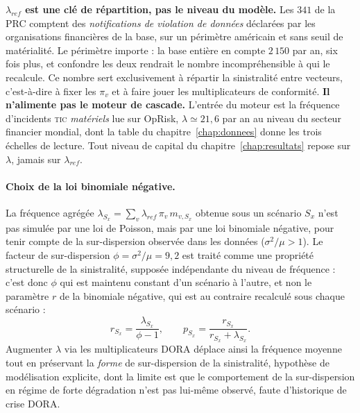 \begin{attention}
\textbf{$\lambda_{ref}$ est une clé de répartition, pas le niveau du modèle.} Les $341$ de la
PRC comptent des \emph{notifications de violation de données} déclarées par les organisations
financières de la base, sur un périmètre américain et sans seuil de matérialité. Le périmètre
importe : la base entière en compte $2\,150$ par an, six fois plus, et confondre les deux
rendrait le nombre incompréhensible à qui le recalcule. Ce nombre sert exclusivement à
répartir la sinistralité entre
vecteurs, c'est-à-dire à fixer les $\pi_v$ et à faire jouer les multiplicateurs de conformité.
\textbf{Il n'alimente pas le moteur de cascade.} L'entrée du moteur est la fréquence
d'incidents \textsc{tic} \emph{matériels} lue sur OpRisk, $\lambda \simeq 21{,}6$ par an au
niveau du secteur financier mondial, dont la table du chapitre~\ref{chap:donnees} donne les
trois échelles de lecture. Tout niveau de capital du chapitre~\ref{chap:resultats} repose sur
$\lambda$, jamais sur $\lambda_{ref}$.
\end{attention}

\paragraph{Choix de la loi binomiale négative.} La fréquence agrégée
$\lambda_{S_x} = \sum_v \lambda_{ref}\,\pi_v\, m_{v,S_x}$ obtenue sous un
scénario $S_x$ n'est pas simulée par une loi de Poisson, mais par une loi
binomiale négative, pour tenir compte de la sur-dispersion observée dans les
données ($\sigma^2/\mu > 1$). Le facteur de sur-dispersion
$\phi = \sigma^2/\mu = 9{,}2$ est traité comme une propriété structurelle de
la sinistralité, supposée indépendante du niveau de fréquence : c'est donc
$\phi$ qui est maintenu constant d'un scénario à l'autre, et non le
paramètre $r$ de la binomiale négative, qui est au contraire recalculé sous
chaque scénario :
\begin{equation}
r_{S_x} = \frac{\lambda_{S_x}}{\phi - 1},
\qquad
p_{S_x} = \frac{r_{S_x}}{r_{S_x} + \lambda_{S_x}}.
\end{equation}
Augmenter $\lambda$ via les multiplicateurs DORA déplace ainsi la fréquence
moyenne tout en préservant la \emph{forme} de sur-dispersion de la
sinistralité, hypothèse de modélisation explicite, dont la limite est
que le comportement de la sur-dispersion en régime de forte dégradation
n'est pas lui-même observé, faute d'historique de crise DORA.

